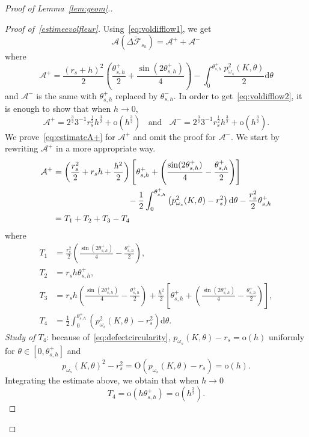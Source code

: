 \documentclass[AHL,Unicode,longabstracts,published]{cedram}
\newcommand{\cA}{\mathcal{A}}
\newcommand{\cF}{\mathcal{F}}
\newcommand{\dd}{\mathrm{d}}
\newcommand{\od}{\mathrm{o}}
\newcommand{\Odd}{\mathrm{O}}
\newcommand{\pass}{\vspace{0.3cm}\noindent}
\newenvironment*{prooff}{\begin{proof}}{\let\qed\relax\end{proof}}
\begin{document}
\begin{proof}[{Proof of Lemma~\ref{lem:geom}.}]
\begin{prooff}[{Proof of~\eqref{estimeevolfleur}}]
Using~\eqref{eq:voldifflow1}, we get
\[
\cA\left(\Delta\widetilde{\cF}_{s_h}\right)= {\cA}^++{\cA}^-
\]
where
\[
\cA^+=\frac{(r_s+h)^2}{2}\left(\frac{\theta_{s,h}^+}{2}+\frac{\sin (2\theta_{s,h}^+)}{4}\right)-\int_0^{\theta_{s,h}^+}\frac{p_{\omega_s}^2(K,\theta)}{2}\dd\theta
\]
and $\cA^-$ is the same with $\theta_{s,h}^+$ replaced by $\theta_{s,h}^-$. In order to get~\eqref{eq:voldifflow2}, it is enough to show that when $h\to 0$,
\begin{equation}\label{eq:estimateA+}
\cA^+=2^{\frac32}3^{-1}r_s^{\frac12}h^{\frac32}+\od\left(h^{\frac32}\right)\;\;\text{ and } \;\;\cA^-=2^{\frac32}3^{-1}r_s^{\frac12}h^{\frac32}+\od\left(h^{\frac32}\right).
\end{equation}
We prove~\eqref{eq:estimateA+} for $\cA^+$ and omit the proof for $\cA^-$. We start by rewriting $\cA^+$ in a more appropriate way.
\begin{equation}\label{eq:rewritingA+}
\begin{aligned}
\cA^+&=\left(\frac{r_s^2}{2}+r_sh+\frac{h^2}{2}\right)\left[\theta_{s,h}^++\left(\frac{\sin(2\theta_{s,h}^+)}{4}-\frac{\theta_{s,h}^+}{2}\right)\right]\\
&\mkern160mu-\frac{1}{2} \int_0^{\theta_{s,h}^+}\left(p_{\omega_s}^2(K,\theta)-r_s^2\right)\dd\theta -\frac{r_s^2}{2}\theta_{s,h}^+
\\
&=T_1+T_2+T_3-T_4 
\end{aligned}
\end{equation}
where
\begin{align*}
T_1&=\frac{r_s^2}{2}\left(\frac{\sin (2\theta_{s,h}^+)}{4}-\frac{\theta_{s,h}^+}{2}\right),\\
T_2&=r_sh\theta_{s,h}^+,\\
T_3&=r_sh\left(\frac{\sin (2\theta_{s,h}^+)}{4}-\frac{\theta_{s,h}^+}{2}\right)+ \frac{h^2}{2}\left[\theta_{s,h}^++\left(\frac{\sin (2\theta_{s,h}^+)}{4}-\frac{\theta_{s,h}^+}{2}\right)\right],\\
T_4&=\frac{1}{2} \int_0^{\theta_{s,h}^+}\left(p_{\omega_s}^2(K,\theta)-r_s^2\right)\dd\theta.
\end{align*}
\noindent \emph{Study of $T_4$}: because of~\eqref{eq:defectcircularity}, $p_{\omega_s}(K,\theta)-r_s=\od(h)$ uniformly for $\theta\in [0,\theta_{s,h}^+]$ and
\[
p_{\omega_s}(K,\theta)^2-r_s^2=\Odd(p_{\omega_s}(K,\theta)-r_s)=\od(h).
\]
Integrating the estimate above, we obtain that when $h\to 0$
\begin{equation}\label{eq:estimT4}
T_4=\od\left(h\theta_{s,h}^+\right)=\od\left(h^{\frac32}\right).
\end{equation}



\end{prooff}
\end{proof}
\end{document}
